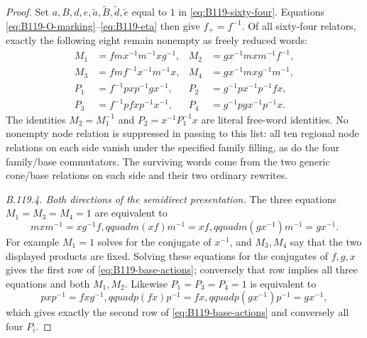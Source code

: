 \begin{proof}
Set $a,B,d,e,\widetilde a,\widetilde B,\widetilde d,
\widetilde e$ equal to $1$ in \eqref{eq:B119-sixty-four}.
Equations \eqref{eq:B119-O-marking}--\eqref{eq:B119-eta} then give
$f_+=f^{-1}$. Of all sixty-four relators, exactly the following
eight remain nonempty as freely reduced words:
\begin{equation}\label{eq:B119-eight-words}
 \begin{aligned}
 M_1&=fmx^{-1}m^{-1}xg^{-1},&
 M_2&=gx^{-1}mxm^{-1}f^{-1},\\
 M_3&=fmf^{-1}x^{-1}m^{-1}x,&
 M_4&=gx^{-1}mxg^{-1}m^{-1},\\
 P_1&=f^{-1}pxp^{-1}gx^{-1},&
 P_2&=g^{-1}px^{-1}p^{-1}fx,\\
 P_3&=f^{-1}pfxp^{-1}x^{-1},&
 P_4&=g^{-1}pgx^{-1}p^{-1}x.
 \end{aligned}
\end{equation}
The identities $M_2=M_1^{-1}$ and
$P_2=x^{-1}P_1^{-1}x$ are literal free-word identities.
No nonempty node relation is suppressed in passing to this list:
all ten regional node relations on each side vanish under the
specified family filling, as do the four family/base commutators.
The surviving words come from the two generic cone/base relations
on each side and their two ordinary rewrites.

\emph{B.119.4. Both directions of the semidirect presentation.}
The three equations $M_1=M_3=M_4=1$ are equivalent to
\begin{equation}\label{eq:B119-m-three}
 mxm^{-1}=xg^{-1}f,qquad
 m(xf)m^{-1}=xf,qquad m(gx^{-1})m^{-1}=gx^{-1}.
\end{equation}
For example $M_1=1$ solves for the conjugate of $x^{-1}$,
and $M_3,M_4$ say that the two displayed products are fixed.
Solving these equations for the conjugates of $f,g,x$ gives
the first row of \eqref{eq:B119-base-actions}; conversely that row
implies all three equations and both $M_1,M_2$.
Likewise $P_1=P_3=P_4=1$ is equivalent to
\begin{equation}\label{eq:B119-p-three}
 pxp^{-1}=fxg^{-1},qquad
 p(fx)p^{-1}=fx,qquad p(gx^{-1})p^{-1}=gx^{-1},
\end{equation}
which gives exactly the second row of
\eqref{eq:B119-base-actions} and conversely all four $P_i$.


\end{proof}
